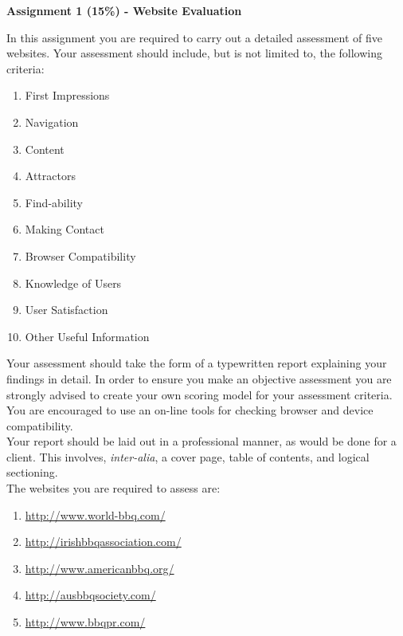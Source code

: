 
	
\begin{flushleft}
\Large\textbf{Assignment 1 (15\%) - Website Evaluation}\\
\end{flushleft}

In this assignment you are required to carry out a detailed assessment of five websites. Your assessment should include, but is not limited to, the following criteria:


\begin{enumerate}
	\item First Impressions
	\item Navigation
	\item Content
	\item Attractors
	\item Find-ability
	\item Making Contact
	\item Browser Compatibility
	\item Knowledge of Users
	\item User Satisfaction
	\item Other Useful Information
\end{enumerate}

Your assessment should take the form of a typewritten report explaining your findings in detail. In order to ensure you make an objective assessment you are strongly advised to create your own scoring model for your assessment criteria. You are encouraged to use an on-line tools for checking browser and device compatibility.\\

Your report should be laid out in a professional manner, as would be done for a client. This involves, \textit{inter-alia}, a cover page, table of contents, and logical sectioning.\\

The websites you are required to assess are:\\

\begin{enumerate}
	\item \href{http://www.world-bbq.com/}{http://www.world-bbq.com/}
	\item \href{http://irishbbqassociation.com/}{http://irishbbqassociation.com/}
	\item \href{http://www.americanbbq.org/}{http://www.americanbbq.org/}
	\item \href{http://ausbbqsociety.com/}{http://ausbbqsociety.com/}
	\item \href{http://www.bbqpr.com/}{http://www.bbqpr.com/}
\end{enumerate}

